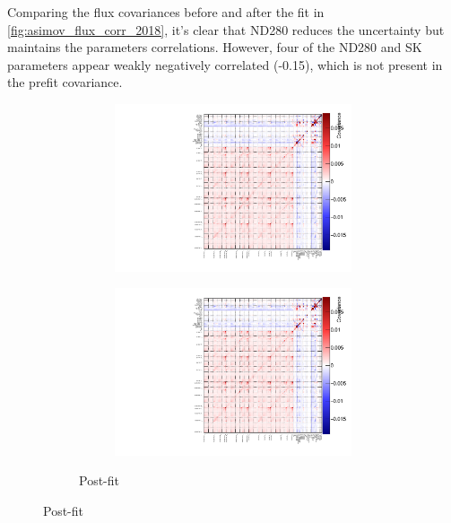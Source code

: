 Comparing the flux covariances before and after the fit in \autoref{fig:asimov_flux_corr_2018}, it's clear that ND280 reduces the uncertainty but maintains the parameters correlations. However, four of the ND280 and SK \nuebar parameters appear weakly negatively correlated (-0.15), which is not present in the prefit covariance.
\begin{figure}[h]
	\begin{subfigure}[t]{\textwidth}
		\begin{subfigure}[t]{0.49\textwidth}
			\includegraphics[width=\textwidth, trim={0mm 0mm 0mm 0mm}, clip,page=8]{figures/mach3/2018/asimov/corr/2018a_MultiPi_Binningv6_NewCov_Asimov_merge_drawCorr}
		\end{subfigure}
		\begin{subfigure}[t]{0.49\textwidth}
			\includegraphics[width=\textwidth, trim={0mm 0mm 0mm 0mm}, clip,page=9]{figures/mach3/2018/asimov/corr/2018a_MultiPi_Binningv6_NewCov_Asimov_merge_drawCorr}
		\end{subfigure}
		\caption{Post-fit}
	\end{subfigure}
	

\end{figure}
